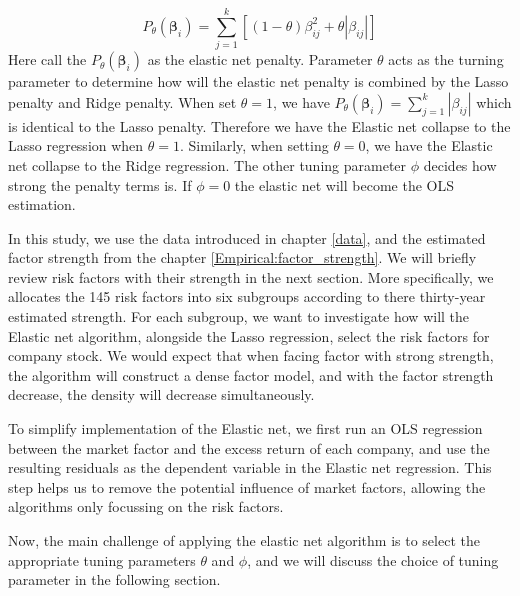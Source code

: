 \[	P_{\theta}(\bm{\beta}_i) =\sum_{j=1}^k [ (1-\theta)\beta_{ij}^2 + \theta |\beta_{ij}|] \label{EN:elastic_net_penalty} \tag{13}\]
Here \citeauthor{Zou2005} call the $P_{\theta}(\bm{\beta}_{i})$ as the elastic net penalty.
Parameter $\theta$ acts as the turning parameter to determine how will the elastic net penalty is combined by the Lasso penalty and Ridge penalty.
When set $\theta = 1$, we have $P_{\theta}(\bm{\beta}_i) =\sum_{j=1}^k  |\beta_{ij}|$ which is identical to the Lasso penalty.
Therefore we have the Elastic net collapse to the Lasso regression when $\theta = 1$.
Similarly, when setting $\theta = 0$, we have the Elastic net collapse to the Ridge regression. 
The other tuning parameter $\phi$ decides how strong the penalty terms is.
If $\phi = 0$ the elastic net will become the OLS estimation.

In this study, we use the data introduced in chapter \ref{data}, and the estimated factor strength from the chapter \ref{Empirical:factor_strength}.
We will briefly review risk factors with their strength in the next section.
More specifically, we allocates the 145 risk factors into six subgroups according to there thirty-year estimated strength.
For each subgroup, we want to investigate how will the Elastic net algorithm, alongside the Lasso regression, select the risk factors for company stock.
We would expect that when facing factor with strong strength, the algorithm will construct a dense factor model, and with the factor strength decrease, the density will decrease simultaneously.

To simplify implementation of the Elastic net, we first run an OLS regression between the market factor and the excess return of each company, and use the resulting residuals as the dependent variable in the Elastic net regression.
This step helps us to remove the potential influence of market factors, allowing the algorithms only focussing on the risk factors. 

Now, the main challenge of applying the elastic net algorithm is to select the appropriate tuning parameters $\theta$ and $\phi$, and we will discuss the choice of tuning parameter in the following section.

